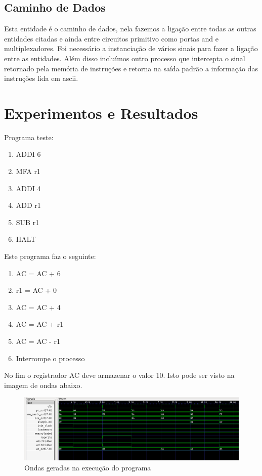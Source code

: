 \documentclass[12pt]{article}
\begin{document}
\subsection{Caminho de Dados}

Esta entidade é o caminho de dados, nela fazemos a ligação entre todas as outras entidades citadas e ainda entre circuitos primitivo como portas and e multiplexadores. Foi necessário a instanciação de vários sinais para fazer a ligação entre as entidades. Além disso incluímos outro processo que intercepta o sinal retornado pela memória de instruções e retorna na saída padrão a informação das instruções lida em ascii.

\section{Experimentos e Resultados}
Programa teste:
\begin{enumerate}
  \item ADDI 6
  \item MFA r1
  \item ADDI 4
  \item ADD r1
  \item SUB r1
  \item HALT
\end{enumerate}
Este programa faz o seguinte:
\begin{enumerate}
  \item AC = AC + 6
  \item r1 = AC + 0
  \item AC = AC + 4
  \item AC = AC + r1
  \item AC = AC - r1
  \item Interrompe o processo
\end{enumerate}
No fim o registrador AC deve armazenar o valor 10.
Isto pode ser visto na imagem de ondas abaixo.
\begin{figure}[ht]
\centering
\includegraphics[width=1\textwidth]{onda.png}
\caption{Ondas geradas na execução do programa}
\label{fig:Arquivo de Ondas}
\end{figure}
\end{document}
